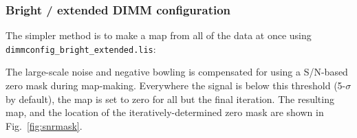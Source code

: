\documentclass[twoside,11pt]{starlink}
\begin{document}
\subsubsection{Bright / extended DIMM configuration}

The simpler method is to make a map from all of the data at once using
\texttt{dimmconfig\_bright\_extended.lis}:


The large-scale noise and negative bowling is compensated for using a
S/N-based zero mask during map-making. Everywhere the signal is below
this threshold (5-$\sigma$ by default), the map is set to zero for all
but the final iteration. The resulting map, and the location of the
iteratively-determined zero mask are shown in Fig.~\ref{fig:snrmask}.
\end{document}

